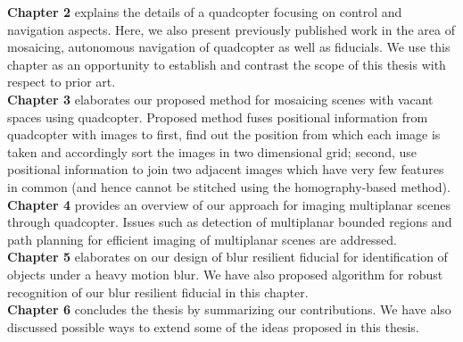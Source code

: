 \noindent \textbf{Chapter 2} explains the details of a quadcopter focusing on
control and navigation aspects. Here, we also present previously published work
in the area of mosaicing, autonomous navigation of quadcopter as well as
fiducials. We use this chapter as an opportunity to establish and contrast the
scope of this thesis with respect to prior art.\\

\noindent \textbf{Chapter 3} elaborates our proposed method for mosaicing
scenes with vacant spaces using quadcopter. Proposed method fuses positional
information from quadcopter with images to first, find out the position from which each
image is taken and accordingly sort the images in two dimensional grid; second,
use positional information to join two adjacent images which have very few features
in common (and hence cannot be stitched using the homography-based method).\\

\noindent \textbf{Chapter 4} provides an overview of our approach
for imaging multiplanar scenes through quadcopter. Issues such as detection of
multiplanar bounded regions and path planning for efficient imaging of multiplanar scenes
are addressed.\\

\noindent \textbf{Chapter 5} elaborates on our design of blur
resilient fiducial for identification of objects under a heavy motion blur. We
have also proposed algorithm for robust recognition of our blur resilient
fiducial in this chapter.\\
 
 \noindent \textbf{Chapter 6} concludes the thesis by summarizing our
 contributions.
  We have also discussed possible ways to extend some of the ideas proposed in this thesis.
